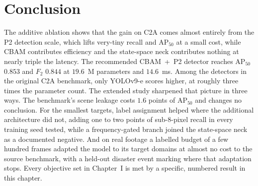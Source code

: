 \section{Conclusion}
The additive ablation shows that the gain on C2A comes almost entirely from
the P2 detection scale, which lifts very-tiny recall and $\mathrm{AP}_{50}$
at a small cost, while CBAM contributes efficiency and the state-space neck
contributes nothing at nearly triple the latency. The recommended CBAM~+~P2
detector reaches $\mathrm{AP}_{50}$ $0.853$ and $F_2$ $0.844$ at $19.6$~M
parameters and $14.6$~ms. Among the detectors in the original C2A benchmark,
only YOLOv9-e scores higher, at roughly three times the parameter count. The
extended study sharpened that picture in three ways. The benchmark's scene
leakage costs $1.6$ points of $\mathrm{AP}_{50}$ and changes no conclusion.
For the smallest targets, label assignment helped where the additional
architecture did not, adding one to two points of sub-8-pixel
recall in every training seed tested, while a frequency-gated branch joined
the state-space neck as a documented negative. And on real footage a labelled
budget of a few hundred frames adapted the model to its target domains at
almost no cost to the source benchmark, with a held-out disaster event
marking where that adaptation stops. Every objective set in Chapter~I is met
by a specific, numbered result in this chapter.
